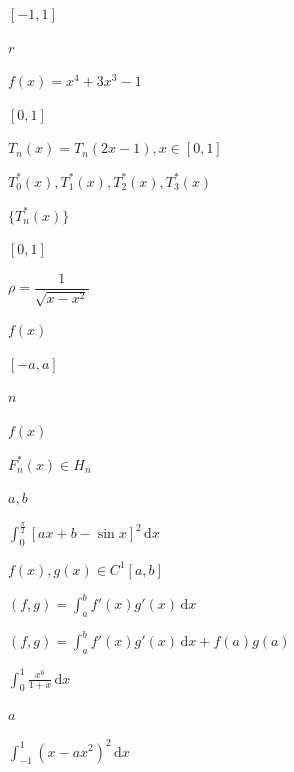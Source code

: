\documentclass[UTF8,fontset=fandol,a4paper]{ctexart}
\begin{document}
\noindent $[-1,1]$\par

\noindent $r$\par

\noindent $f(x)=x^4+3x^3-1$\par

\noindent $[0,1]$\par

\noindent $T_n(x)=T_n(2x-1),x\in[0,1]$\par

\noindent $T_0^*(x),T_1^*(x),T_2^*(x),T_3^*(x)$\par

\noindent $\{T_n^*(x)\}$\par

\noindent $[0,1]$\par

\noindent $\rho=\dfrac1{\sqrt{x-x^2}}$\par

\noindent $f(x)$\par

\noindent $[-a,a]$\par

\noindent $n$\par

\noindent $f(x)$\par

\noindent $F_n^*(x)\in H_n$\par

\noindent $a,b$\par

\noindent $\displaystyle\int_0^{\frac\pi2}[ax+b-\sin x]^2\,\mathrm dx$\par

\noindent $f(x),g(x)\in C^1[a,b]$\par

\noindent $(f,g)=\displaystyle\int_a^b f'(x)g'(x)\,\mathrm dx$\par

\noindent $(f,g)=\displaystyle\int_a^b f'(x)g'(x)\,\mathrm dx+f(a)g(a)$\par

\noindent $\displaystyle\int_0^1\frac{x^6}{1+x}\,\mathrm dx$\par

\noindent $a$\par

\noindent $\displaystyle\int_{-1}^1(x-ax^2)^2\,\mathrm dx$\par
\end{document}
